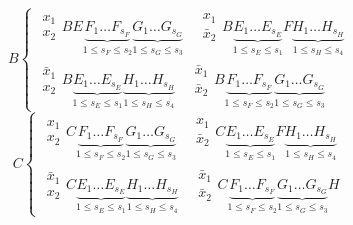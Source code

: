 \documentclass[12pt,a4paper,oneside,fleqn,leqno]{article}
\theoremstyle{definition}
\begin{document}
			$$
			B\begin{cases}
\begin{matrix}x_1\\x_2\end{matrix} BE\underbrace{F_1\ldots F_{s_F}}_{1 \leqslant s_F \leqslant s_2}\underbrace{G_1\ldots G_{s_G}}_{1 \leqslant s_G \leqslant s_3} \quad
 \begin{matrix}x_1\\\bar{x}_2\end{matrix} B\underbrace{E_1\ldots E_{s_E}}_{1 \leqslant s_E \leqslant s_1}F\underbrace{H_1\ldots H_{s_H}}_{1 \leqslant s_H \leqslant s_4} \\
 \begin{matrix}\bar{x}_1\\x_2\end{matrix} B\underbrace{E_1\ldots E_{s_E}}_{1 \leqslant s_E \leqslant s_1}\underbrace{H_1\ldots H_{s_H}}_{1 \leqslant s_H \leqslant s_4} \quad
\begin{matrix}\bar{x}_1\\\bar{x}_2\end{matrix} B\underbrace{F_1\ldots F_{s_F}}_{1 \leqslant s_F \leqslant s_2}\underbrace{G_1\ldots G_{s_G}}_{1 \leqslant s_G \leqslant s_3}
			\end{cases}
			$$
			$$
			C\begin{cases}
\begin{matrix}x_1\\x_2\end{matrix} C\underbrace{F_1\ldots F_{s_F}}_{1 \leqslant s_F \leqslant s_2}\underbrace{G_1\ldots G_{s_G}}_{1 \leqslant s_G \leqslant s_3} \quad
 \begin{matrix}x_1\\\bar{x}_2\end{matrix} C\underbrace{E_1\ldots E_{s_E}}_{1 \leqslant s_E \leqslant s_1}F\underbrace{H_1\ldots H_{s_H}}_{1 \leqslant s_H \leqslant s_4} \\
 \begin{matrix}\bar{x}_1\\x_2\end{matrix} C\underbrace{E_1\ldots E_{s_E}}_{1 \leqslant s_E \leqslant s_1}\underbrace{H_1\ldots H_{s_H}}_{1 \leqslant s_H \leqslant s_4} \quad
\begin{matrix}\bar{x}_1\\\bar{x}_2\end{matrix} C\underbrace{F_1\ldots F_{s_F}}_{1 \leqslant s_F \leqslant s_2}\underbrace{G_1\ldots G_{s_G}}_{1 \leqslant s_G \leqslant s_3}H
			\end{cases}
			$$
\end{document}
